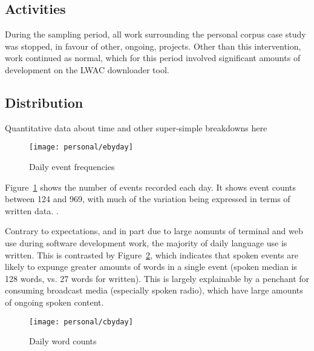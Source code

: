 \subsection{Activities}
During the sampling period, all work surrounding the personal corpus case study was stopped, in favour of other, ongoing, projects.  Other than this intervention, work continued as normal, which for this period involved significant amounts of development on the LWAC downloader tool.







\subsection{Distribution}
Quantitative data about time and other super-simple breakdowns here



\begin{figure}[hp]
    \centering
    \texttt{[image: personal/ebyday]}
    \caption{Daily event frequencies}
    \label{fig:personal:eventcountbyday}
\end{figure}


Figure~\ref{fig:personal:eventcountbyday} shows the number of events recorded each day.  It shows event counts between 124 and 969, with much of the variation being expressed in terms of written data.  .

Contrary to expectations, and in part due to large aomunts of terminal and web use during software development work, the majority of daily language use is written.  This is contrasted by Figure~\ref{fig:personal:wordcountbyday}, which indicates that spoken events are likely to expunge greater amounts of words in a single event (spoken median is 128 words, vs. 27 words for written).  This is largely explainable by a penchant for consuming broadcast media (especially spoken radio), which have large amounts of ongoing spoken content.

% 


\begin{figure}[hp]
\centering
\texttt{[image: personal/cbyday]}
\caption{Daily word counts}
\label{fig:personal:wordcountbyday}
\end{figure}

